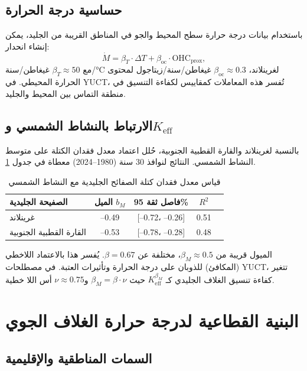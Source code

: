 \documentclass[11pt,a4paper]{article}
\newcommand{\Keff}{K_{\mathrm{eff}}}
\newcommand{\be}{\beta}
\begin{document}
	\subsection{حساسية درجة الحرارة}
	
	باستخدام بيانات درجة حرارة سطح المحيط والجو في المناطق القريبة من الجليد، يمكن إنشاء انحدار:
	\[
	\dot{M} = \beta_T \cdot \Delta T + \beta_{\text{oc}} \cdot \text{OHC}_{\text{prox}},
	\]
	مع \(\beta_T \approx 50\) غيغاطن/سنة/°C لغرينلاند، \(\beta_{\text{oc}} \approx 0.3\) غيغاطن/سنة/زيتاجول لمحتوى الحرارة المحيطي. في YUCT، تُفسر هذه المعاملات كمقاييس لكفاءة التنسيق في منطقة التماس بين المحيط والجليد.
	
	\subsection{الارتباط بالنشاط الشمسي و\(\Keff\)}
	
	بالنسبة لغرينلاند والقارة القطبية الجنوبية، حُلل اعتماد معدل فقدان الكتلة على متوسط النشاط الشمسي. النتائج لنوافذ 30 سنة (1980–2024) معطاة في جدول \ref{tab:icescaling}.
	
	\begin{table}[htbp]
		\centering
		\caption{قياس معدل فقدان كتلة الصفائح الجليدية مع النشاط الشمسي}
		\label{tab:icescaling}
		\begin{tabular}{@{}lcccc@{}}
			\toprule
			الصفيحة الجليدية & الميل \(b_M\) & فاصل ثقة 95\% & \(R^2\) \\
			\midrule
			غرينلاند & –0.49 & [–0.72، –0.26] & 0.51 \\
			القارة القطبية الجنوبية & –0.53 & [–0.78، –0.28] & 0.48 \\
			\bottomrule
		\end{tabular}
	\end{table}
	
	الميول قريبة من \(\beta_M \approx 0.5\)، مختلفة عن \(\be = 0.67\). يُفسر هذا بالاعتماد اللاخطي (المكافئ) للذوبان على درجة الحرارة وتأثيرات العتبة. في مصطلحات YUCT، تتغير كفاءة تنسيق الغلاف الجليدي كـ \(\Keff^{\beta_M}\) حيث \(\beta_M = \be \cdot \nu\) و\(\nu \approx 0.75\) أس اللا خطية.
	
	\section{البنية القطاعية لدرجة حرارة الغلاف الجوي}
	
	\subsection{السمات المناطقية والإقليمية}
	
\end{document}
